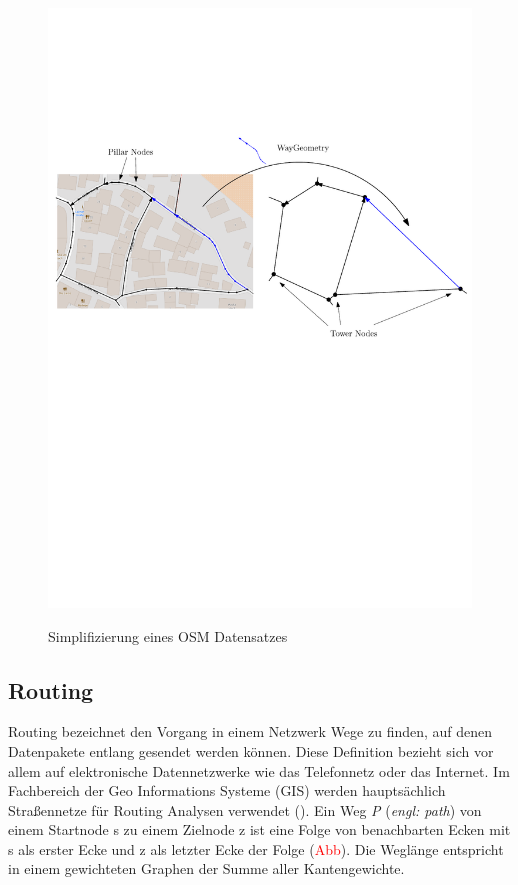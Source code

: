 \documentclass[12pt,a4paper]{article}
\newcommand\todo[1]{\textcolor{red}{#1}}
\begin{document}
\begin{figure}[h]
\centering
\includegraphics[width = \textwidth]{../media/towers.pdf} \\
\caption{Simplifizierung eines OSM Datensatzes}
\label{fig:tower}
\end{figure}

\subsection{Routing}

Routing bezeichnet den Vorgang in einem Netzwerk Wege zu finden, auf denen Datenpakete entlang gesendet werden können. Diese Definition bezieht sich vor allem auf elektronische Datennetzwerke wie das Telefonnetz oder das Internet. Im Fachbereich der Geo Informations Systeme (GIS) werden hauptsächlich Straßennetze für Routing Analysen verwendet (\cite[165]{handbook}). Ein Weg \textit{P} (\textit{engl: path}) von einem Startnode s zu einem Zielnode z ist eine Folge von benachbarten Ecken mit s als erster Ecke und z als letzter Ecke der Folge (\todo{Abb}).
Die Weglänge entspricht in einem gewichteten Graphen der Summe aller Kantengewichte.
\end{document}
